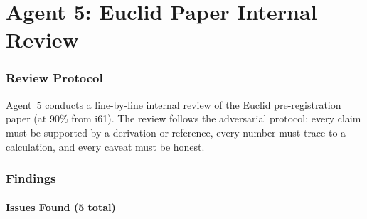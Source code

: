 \documentclass[11pt,a4paper]{article}
\begin{document}
\part{Agent 5: Euclid Paper Internal Review}
\label{part:euclid-review}

\section{Review Protocol}

Agent~5 conducts a line-by-line internal review of the Euclid pre-registration paper (at 90\% from i61). The review follows the adversarial protocol: every claim must be supported by a derivation or reference, every number must trace to a calculation, and every caveat must be honest.

\section{Findings}

\subsection{Issues Found (5 total)}
\end{document}
